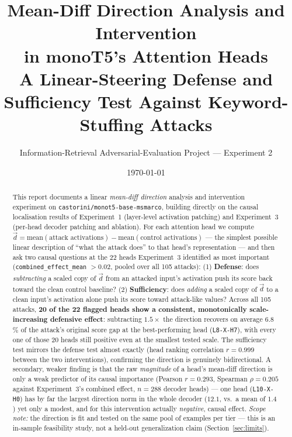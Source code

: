 \documentclass[11pt]{article}
\title{\textbf{Mean-Diff Direction Analysis and Intervention \\[2pt]
in monoT5's Attention Heads} \\[6pt]
\large A Linear-Steering Defense and Sufficiency Test Against
Keyword-Stuffing Attacks}
\author{Information-Retrieval Adversarial-Evaluation Project --- Experiment 2}
\date{\today}
\newcommand{\dirvec}{\ensuremath{\vec{d}}}
\begin{document}
\maketitle

\begin{abstract}
This report documents a linear \emph{mean-diff direction} analysis and
intervention experiment on \texttt{castorini/monot5-base-msmarco}, building
directly on the causal localisation results of Experiment~1 (layer-level
activation patching) and Experiment~3 (per-head decoder patching and
ablation). For each attention head we compute
$\dirvec = \text{mean}(\text{attack activations}) - \text{mean}(\text{control
activations})$ --- the simplest possible linear description of ``what the
attack does'' to that head's representation --- and then ask two causal
questions at the 22 heads Experiment~3 identified as most important
(\texttt{combined\_effect\_mean} $>0.02$, pooled over all 105 attacks): (1)
\textbf{Defense}: does \emph{subtracting} a scaled copy of $\dirvec$ from an
attacked input's activation push its score back toward the clean control
baseline? (2) \textbf{Sufficiency}: does \emph{adding} a scaled copy of
$\dirvec$ to a clean input's activation alone push its score toward
attack-like values? Across all 105 attacks, \textbf{20 of the 22 flagged
heads show a consistent, monotonically scale-increasing defensive effect}:
subtracting $1.5\times$ the direction recovers on average
6.8\,\% of the attack's original score gap at the best-performing head
(\texttt{L8-X-H7}), with every one of those 20 heads still positive even at
the smallest tested scale. The sufficiency test mirrors the defense test
almost exactly (head ranking correlation $r{=}0.999$ between the two
interventions), confirming the direction is genuinely bidirectional. A
secondary, weaker finding is that the raw \emph{magnitude} of a head's
mean-diff direction is only a weak predictor of its causal importance
(Pearson $r{=}0.293$, Spearman $\rho{=}0.205$ against Experiment~3's
combined effect, $n{=}288$ decoder heads) --- one head
(\texttt{L10-X-H0}) has by far the largest direction norm in the whole
decoder ($12.1$, vs.\ a mean of $1.4$) yet only a modest, and for this
intervention actually \emph{negative}, causal effect. \emph{Scope note:}
the direction is fit and tested on the same pool of examples per tier ---
this is an in-sample feasibility study, not a held-out generalization claim
(Section~\ref{sec:limits}).
\end{abstract}

\tableofcontents
\newpage
\end{document}

